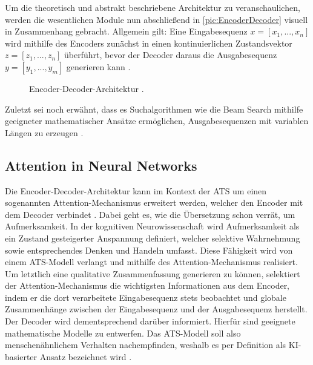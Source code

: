 \noindent
Um die theoretisch und abstrakt beschriebene Architektur zu veranschaulichen, werden die wesentlichen Module nun abschließend in \autoref{pic:EncoderDecoder} visuell in Zusammenhang gebracht. Allgemein gilt: Eine Eingabesequenz $x = [x_{1}, ..., x_{n}]$ wird mithilfe des Encoders zunächst in einen kontinuierlichen Zustandsvektor $z = [z_{1}, ..., z_{n}]$ überführt, bevor der Decoder daraus die Ausgabesequenz $y = [y_{1}, ..., y_{m}]$ generieren kann \cite{VAS17}.

\begin{figure}[h!]
  \centering
  \caption{Encoder-Decoder-Architektur \cite[S.~375]{ZHA20}.}
  \label{pic:EncoderDecoder}
\end{figure}

\noindent
Zuletzt sei noch erwähnt, dass es Suchalgorithmen wie die Beam Search mithilfe geeigneter mathematischer Ansätze ermöglichen, Ausgabesequenzen mit variablen Längen zu erzeugen \cite[S.~387]{ZHA20}.


\subsection{Attention in Neural Networks}
\noindent
Die Encoder-Decoder-Architektur kann im Kontext der \ac{ATS} um einen sogenannten Attention-Mechanismus erweitert werden, welcher den Encoder mit dem Decoder verbindet \cite{VAS17}. Dabei geht es, wie die Übersetzung schon verrät, um Aufmerksamkeit. In der kognitiven Neurowissenschaft wird Aufmerksamkeit als ein Zustand gesteigerter Anspannung definiert, welcher selektive Wahrnehmung sowie entsprechendes Denken und Handeln umfasst. Diese Fähigkeit wird von einem \ac{ATS}-Modell verlangt und mithilfe des Attention-Mechanismus realisiert. Um letztlich eine qualitative Zusammenfassung generieren zu können, selektiert der Attention-Mechanismus die wichtigsten Informationen aus dem Encoder, indem er die dort verarbeitete Eingabesequenz stets beobachtet und globale Zusammenhänge zwischen der Eingabesequenz und der Ausgabesequenz herstellt. Der Decoder wird dementsprechend darüber informiert. Hierfür sind geeignete mathematische Modelle zu entwerfen. Das \ac{ATS}-Modell soll also menschenähnlichem Verhalten nachempfinden, weshalb es per Definition als KI-basierter Ansatz bezeichnet wird \cite[S.~389]{ZHA20}.\\

